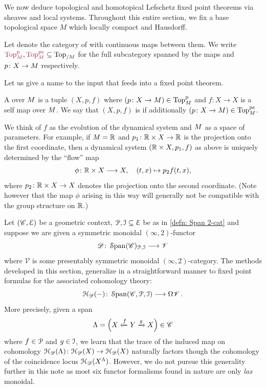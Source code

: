 We now deduce  topological and homotopical Lefschetz fixed point theorems
via sheaves and local systems. Throughout this entire section, we fix a base 
topological space $M$ which locally compact and Hausdorff.

\begin{notation}
  Let \mdef{$\Top$} denote the category of 
  with continuous maps between them.
  We write $\mdef{\pTop{\base}}, \mdef{\psTop{\base}}\subseteq \Top_{/\base}$ 
  for the full subcategory spanned by the  maps and
   $p\colon X\to M$ respectively.
\end{notation}

Let us give a name to the input that feeds into a fixed point theorem.

\begin{defn}\label{defn: dynamical system}
  A  over $M$ is a tuple $(X,p,f)$ where
  $(p\colon X\to M)\in \mathrm{Top}^{\mathrm{p}}_{M}$ and $f\colon X\to X$ is a self map over $M$. 
  We say that $(X,p,f)$ is  if additionally
  $(p\colon X\to M)\in \mathrm{Top}^{\mathrm{ps}}_{M}$. 
\end{defn}

We think of $f$ as the evolution of the dynamical system and $M$ as a space of parameters.
For example, if $M = \mathbb{R}$ and $p_1\colon\mathbb{R}\times X\to\mathbb{R}$ is the projection onto
the first coordinate, then a dynamical system $(\mathbb{R}\times X ,p_1, f)$
as above is uniquely determined by the ``flow'' map 
\[\phi\colon\mathbb{R}\times X\longrightarrow X,\quad (t,x)\mapsto p_2f(t,x),\]
where $p_2\colon\mathbb{R}\times X\to X$ denotes the projection onto the second coordinate. 
(Note however that the map $\phi$ arising in this way will generally not be compatible 
with the group structure on $\mathbb{R}$.)

\begin{rmk}
  Let $(\mathscr{C},\mathcal{E})$ be a geometric context, $\mathcal{P},\mathcal{I}\subseteq \mathcal{E}$ be as 
  in \cref{defn: Span 2-cat} and suppose we are given a symmetric 
  monoidal $(\infty,2)$-functor 
  \[ \mathscr{D} \colon \operatorname{\mathcal S\mathrm{pan}}({\mathscr{C}})_{\mathcal{P},\mathcal{I}}\longrightarrow \mathscr{V}\]
  where $\mathscr{V}$ is some presentably symmetric monoidal $(\infty,2)$-category.
 The methods developed in this section, generalize in a straightforward manner to 
 fixed point formulas for the associated cohomology theory:
  \[ \mathcal{H}_{\mathscr{D}}(-) \colon \operatorname{\mathcal S\mathrm{pan}}({\mathscr{C}, \mathcal{P},\mathcal{I}})\longrightarrow \Omega\mathscr{V}\,.\]
  More precisely, given a span 
  \[ \Lambda = \left( X \xleftarrow{f} Y \xrightarrow{g} X\right) \in \mathscr{C}\]
    where $f\in \mathcal{P}$ and $g\in \mathcal{I}$, we learn that the trace of the induced
    map on cohomology $\mathcal{H}_{\mathscr{D}}(\Lambda)\colon \mathcal{H}_{\mathscr{D}}(X)\to \mathcal{H}_{\mathscr{D}}(X)$ naturally factors
    though the cohomology of the coincidence locus $\mathcal{H}_{\mathscr{D}}(X^{\Lambda})$.
    However, we do not pursue this generality further in this note as most six functor
    formalisms found in nature are only \emph{lax} monoidal. 
\end{rmk}


